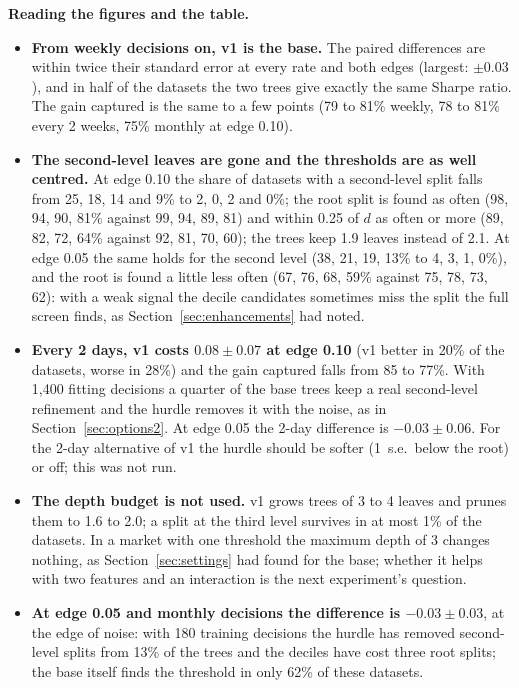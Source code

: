 \documentclass[11pt,a4paper]{article}
\newcommand{\1}{\mathbf{1}}
\begin{document}
\textbf{Reading the figures and the table.}
\begin{itemize}\setlength{\itemsep}{1pt}
\item \textbf{From weekly decisions on, v1 is the base.} The paired differences are within twice their standard error at every rate and both edges (largest: $\pm0.03$), and in half of the datasets the two trees give exactly the same Sharpe ratio. The gain captured is the same to a few points (79 to 81\% weekly, 78 to 81\% every 2 weeks, 75\% monthly at edge 0.10).
\item \textbf{The second-level leaves are gone and the thresholds are as well centred.} At edge 0.10 the share of datasets with a second-level split falls from 25, 18, 14 and 9\% to 2, 0, 2 and 0\%; the root split is found as often (98, 94, 90, 81\% against 99, 94, 89, 81) and within 0.25 of $d$ as often or more (89, 82, 72, 64\% against 92, 81, 70, 60); the trees keep 1.9 leaves instead of 2.1. At edge 0.05 the same holds for the second level (38, 21, 19, 13\% to 4, 3, 1, 0\%), and the root is found a little less often (67, 76, 68, 59\% against 75, 78, 73, 62): with a weak signal the decile candidates sometimes miss the split the full screen finds, as Section~\ref{sec:enhancements} had noted.
\item \textbf{Every 2 days, v1 costs $0.08\pm0.07$ at edge 0.10} (v1 better in 20\% of the datasets, worse in 28\%) and the gain captured falls from 85 to 77\%. With 1{,}400 fitting decisions a quarter of the base trees keep a real second-level refinement and the hurdle removes it with the noise, as in Section~\ref{sec:options2}. At edge 0.05 the 2-day difference is $-0.03\pm0.06$. For the 2-day alternative of v1 the hurdle should be softer (1~s.e.\ below the root) or off; this was not run.
\item \textbf{The depth budget is not used.} v1 grows trees of 3 to 4 leaves and prunes them to 1.6 to 2.0; a split at the third level survives in at most 1\% of the datasets. In a market with one threshold the maximum depth of 3 changes nothing, as Section~\ref{sec:settings} had found for the base; whether it helps with two features and an interaction is the next experiment's question.
\item \textbf{At edge 0.05 and monthly decisions the difference is $-0.03\pm0.03$}, at the edge of noise: with 180 training decisions the hurdle has removed second-level splits from 13\% of the trees and the deciles have cost three root splits; the base itself finds the threshold in only 62\% of these datasets.
\end{itemize}
\end{document}
